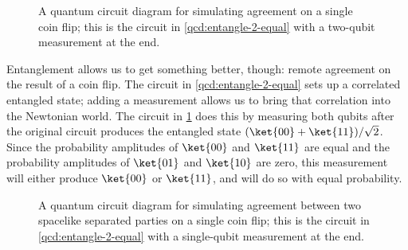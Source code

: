 \begin{figure}
  \centerline{}
  \caption{A quantum circuit diagram for simulating agreement on a single coin
    flip; this is the circuit in \cref{qcd:entangle-2-equal} with a two-qubit
    measurement at the end.}
  \label{qcd:fair-coin-agreement-local}
\end{figure}

Entanglement allows us to get something better, though: remote agreement on the
result of a coin flip.  The circuit in \cref{qcd:entangle-2-equal} sets up a
correlated entangled state; adding a measurement allows us to bring that
correlation into the Newtonian world.  The circuit in
\cref{qcd:fair-coin-agreement-local} does this by measuring both qubits after
the original circuit produces the entangled state $(\ket{00} +
\ket{11})/\sqrt{2}$.  Since the probability amplitudes of $\ket{00}$ and
$\ket{11}$ are equal and the probability amplitudes of $\ket{01}$ and $\ket{10}$
are zero, this measurement will either produce $\ket{00}$ or $\ket{11}$, and
will do so with equal probability.

\begin{figure}
  \centerline{}
  
  \caption{A quantum circuit diagram for simulating agreement between two
    spacelike separated parties on a single coin flip; this is the circuit in
    \cref{qcd:entangle-2-equal} with a single-qubit measurement at the end.}
  \label{qcd:fair-coin-agreement-separated}
\end{figure}


